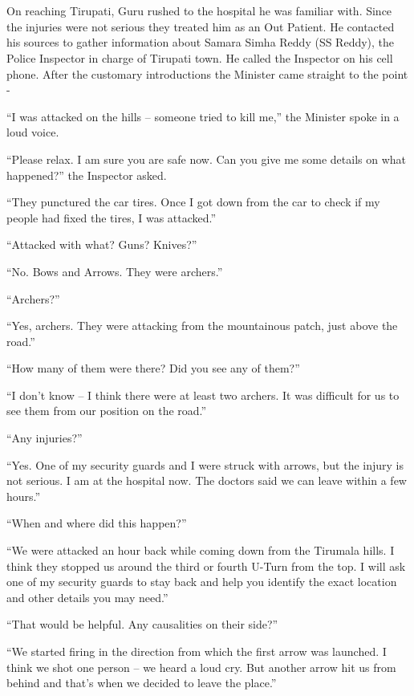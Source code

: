 \chapter{}

On reaching Tirupati, Guru rushed to the hospital he was familiar with. Since
the injuries were not serious they treated him as an Out Patient. He contacted
his sources to gather information about Samara Simha Reddy (SS Reddy), the
Police Inspector in charge of Tirupati town. He called the Inspector on his cell
phone. After the customary introductions the Minister came straight to the point
-

“I was attacked on the hills – someone tried to kill me,” the Minister spoke in
a loud voice.

“Please relax. I am sure you are safe now. Can you give me some details on what
happened?” the Inspector asked.

“They punctured the car tires. Once I got down from the car to check if my
people had fixed the tires, I was attacked.”

“Attacked with what? Guns? Knives?”

“No. Bows and Arrows. They were archers.”

“Archers?”

“Yes, archers. They were attacking from the mountainous patch, just above the
road.”

“How many of them were there? Did you see any of them?”

“I don't know – I think there were at least two archers. It was difficult for us
to see them from our position on the road.”

“Any injuries?”

“Yes. One of my security guards and I were struck with arrows, but the injury is
not serious. I am at the hospital now. The doctors said we can leave within a
few hours.”

“When and where did this happen?”

“We were attacked an hour back while coming down from the Tirumala hills. I
think they stopped us around the third or fourth U-Turn from the top. I will ask
one of my security guards to stay back and help you identify the exact location
and other details you may need.”

“That would be helpful. Any causalities on their side?”

“We started firing in the direction from which the first arrow was launched. I
think we shot one person – we heard a loud cry. But another arrow hit us from
behind and that's when we decided to leave the place.”

